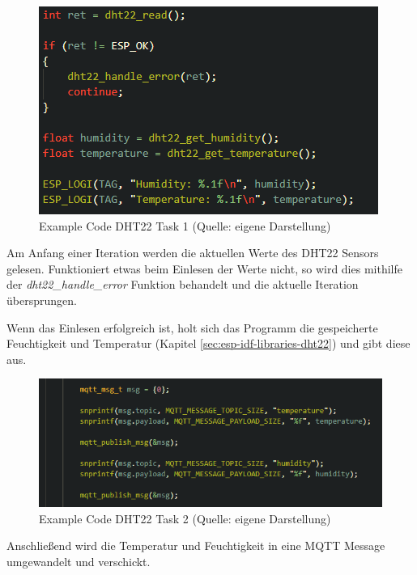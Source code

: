 \begin{figure}[H]
    \begin{center}
        \includegraphics[scale=0.8]{images/example_code_dht22_task_one.png}
        \caption{Example Code DHT22 Task 1 (Quelle: eigene Darstellung)}
        \label{abb:example_code_dht22_task_one}
    \end{center}
\end{figure}

Am Anfang einer Iteration werden die aktuellen Werte des DHT22 Sensors gelesen. Funktioniert etwas beim Einlesen der Werte nicht, so wird dies mithilfe der \textit{dht22\_handle\_error} Funktion behandelt und die aktuelle Iteration übersprungen.

Wenn das Einlesen erfolgreich ist, holt sich das Programm die gespeicherte Feuchtigkeit und Temperatur (Kapitel \ref{sec:esp-idf-libraries-dht22}) und gibt diese aus.

\begin{figure}[H]
    \begin{center}
        \includegraphics[scale=0.8]{images/example_code_dht22_task_two.png}
        \caption{Example Code DHT22 Task 2 (Quelle: eigene Darstellung)}
        \label{abb:example_code_dht22_task_two}
    \end{center}
\end{figure}

Anschließend wird die Temperatur und Feuchtigkeit in eine MQTT Message umgewandelt und verschickt.

